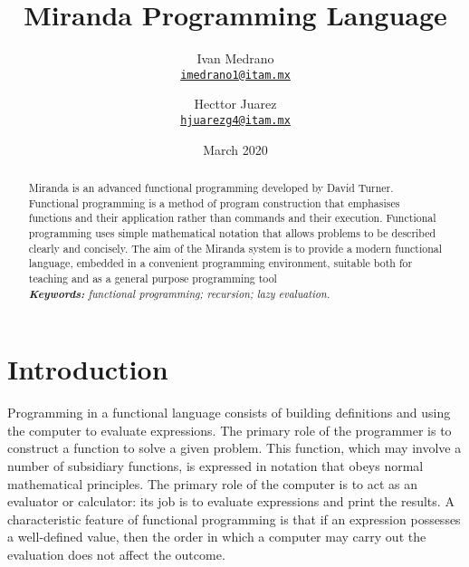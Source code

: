 \documentclass[11pt]{article}
\title{Miranda Programming Language}
\author{Ivan Medrano\\%
    \href{imedrano1@itam.mx}{\texttt{imedrano1@itam.mx}} %
\and Hecttor Juarez\\%
    \href{mailto:secondauthor@ufl.edu}{\texttt{hjuarezg4@itam.mx}} %
    }
\date{March 2020}
\begin{document}
{
\maketitle

\begin{abstract}
Miranda is an advanced functional programming developed by David Turner.
Functional programming is a method of program construction that emphasises
functions and their application rather than commands and their execution.
Functional programming uses simple mathematical notation that allows problems to be described
clearly and concisely. The aim of the Miranda system is to provide a modern 
functional language, embedded in a convenient programming environment, 
suitable both for teaching and as a general purpose programming tool
\\
\textit{\textbf{Keywords: }%
functional programming; recursion; lazy evaluation.}\\ %

\end{abstract}
}


\section{Introduction}

Programming in a functional language consists of building definitions and
using the computer to evaluate expressions. The primary role of the programmer
is to construct a function to solve a given problem. This function,
which may involve a number of subsidiary functions, is expressed in notation
that obeys normal mathematical principles. The primary role of the computer
is to act as an evaluator or calculator: its job is to evaluate expressions
and print the results.
A characteristic feature of functional programming is that if an expression
possesses a well-defined value, then the order in which a computer may carry
out the evaluation does not affect the outcome.
\end{document}
